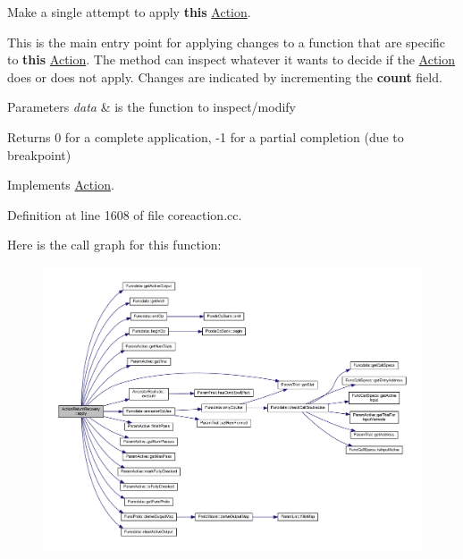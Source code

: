 Make a single attempt to apply {\bfseries{this}} \mbox{\hyperlink{class_action}{Action}}. 

This is the main entry point for applying changes to a function that are specific to {\bfseries{this}} \mbox{\hyperlink{class_action}{Action}}. The method can inspect whatever it wants to decide if the \mbox{\hyperlink{class_action}{Action}} does or does not apply. Changes are indicated by incrementing the {\bfseries{count}} field. 
\begin{DoxyParams}{Parameters}
{\em data} & is the function to inspect/modify \\
\hline
\end{DoxyParams}
\begin{DoxyReturn}{Returns}
0 for a complete application, -\/1 for a partial completion (due to breakpoint) 
\end{DoxyReturn}


Implements \mbox{\hyperlink{class_action_aac1c3999d6c685b15f5d9765a4d04173}{Action}}.



Definition at line 1608 of file coreaction.\+cc.

Here is the call graph for this function\+:
\nopagebreak
\begin{figure}[H]
\begin{center}
\leavevmode
\includegraphics[width=350pt]{class_action_return_recovery_aaad5058cd2347ea61be24b63f8b17d60_cgraph}
\end{center}
\end{figure}
\mbox{\label{class_action_return_recovery_a5871a6ac754811bf330d21aa2b375714}} 
